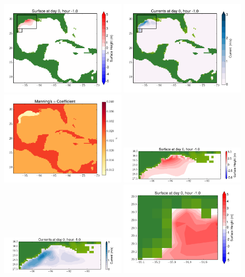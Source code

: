 \documentclass[11pt]{article}
\begin{document}
\vskip 10pt 
\includegraphics[width=0.475\textwidth]{frame0071fig1.png}
\includegraphics[width=0.475\textwidth]{frame0071fig2.png}
\vskip 10pt 
\includegraphics[width=0.475\textwidth]{frame0071fig3.png}
\includegraphics[width=0.475\textwidth]{frame0071fig4.png}
\vskip 10pt 
\includegraphics[width=0.475\textwidth]{frame0071fig5.png}
\includegraphics[width=0.475\textwidth]{frame0071fig6.png}
\end{document}
